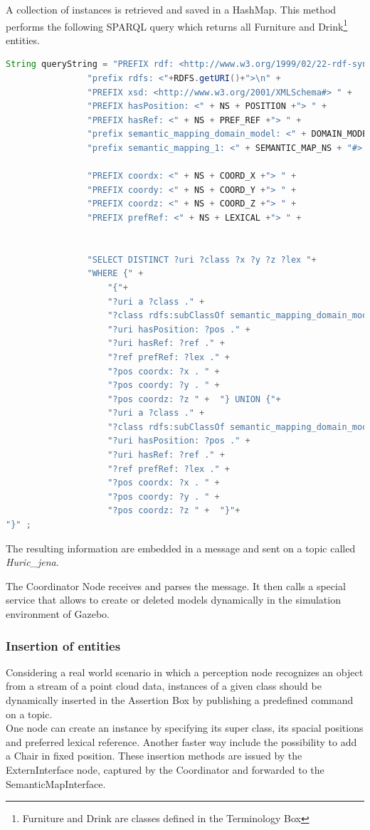 A collection of instances is retrieved and saved in a HashMap. This method performs the following SPARQL query which returns all Furniture and Drink\footnote{Furniture and Drink are classes defined in the Terminology Box} entities.

\begin{lstlisting}[language=Java]
String queryString = "PREFIX rdf: <http://www.w3.org/1999/02/22-rdf-syntax-ns#>" +
				"prefix rdfs: <"+RDFS.getURI()+">\n" +
	    		"PREFIX xsd: <http://www.w3.org/2001/XMLSchema#> " +
	    		"PREFIX hasPosition: <" + NS + POSITION +"> " +
	    		"PREFIX hasRef: <" + NS + PREF_REF +"> " +
				"prefix semantic_mapping_domain_model: <" + DOMAIN_MODEL_NS + "#> \n"+
				"prefix semantic_mapping_1: <" + SEMANTIC_MAP_NS + "#> \n"+
	    		
	    		"PREFIX coordx: <" + NS + COORD_X +"> " +
	    		"PREFIX coordy: <" + NS + COORD_Y +"> " +
	    		"PREFIX coordz: <" + NS + COORD_Z +"> " +
	    		"PREFIX prefRef: <" + NS + LEXICAL +"> " +
	    		
	    		
	    		"SELECT DISTINCT ?uri ?class ?x ?y ?z ?lex "+
	    		"WHERE {" + 
	    			"{"+
		    		"?uri a ?class ." + 
		    		"?class rdfs:subClassOf semantic_mapping_domain_model:Furniture ."+
		    		"?uri hasPosition: ?pos ." + 
		    		"?uri hasRef: ?ref ." + 
		    		"?ref prefRef: ?lex ." + 
		    		"?pos coordx: ?x . " + 
		    		"?pos coordy: ?y . " + 
		    		"?pos coordz: ?z " +  "} UNION {"+
		    		"?uri a ?class ." + 
		    		"?class rdfs:subClassOf semantic_mapping_domain_model:Drink ." +
		    		"?uri hasPosition: ?pos ." + 
		    		"?uri hasRef: ?ref ." + 
		    		"?ref prefRef: ?lex ." + 
		    		"?pos coordx: ?x . " + 
		    		"?pos coordy: ?y . " + 
		    		"?pos coordz: ?z " +  "}"+
"}" ;
\end{lstlisting}
The resulting information are embedded in a message and sent on a topic called \textit{Huric\_jena}.

The Coordinator Node receives and parses the message. It then calls a special service that allows to create or deleted models dynamically in the simulation environment of Gazebo.


\subsubsection{Insertion of entities}
\label{subsec: insertion}
Considering a real world scenario in which a perception node recognizes an object from a stream of a point cloud data, instances of a given class should be dynamically inserted in the Assertion Box by publishing a predefined command on a topic.\\
One node can create an instance by specifying its super class, its spacial positions and preferred lexical reference. Another faster way include the possibility to add a Chair in fixed position. These insertion methods are issued by the ExternInterface node, captured by the Coordinator and forwarded to the SemanticMapInterface.


